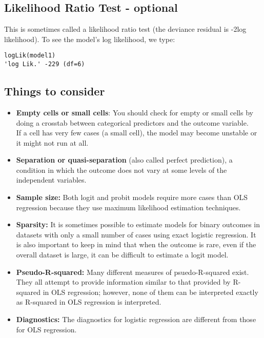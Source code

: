 \documentclass[]{article}
\begin{document}
\subsection{Likelihood Ratio Test - optional}
This is sometimes called a likelihood ratio test (the deviance residual is -2log likelihood). To see the model's log likelihood, we type:
\begin{verbatim}
logLik(model1)
'log Lik.' -229 (df=6)
\end{verbatim}
\subsection{Things to consider}
\begin{itemize}
\item \textbf{Empty cells or small cells}: You should check for empty or small cells by doing a crosstab between categorical predictors and the outcome variable.\\ If a cell has very few cases (a small cell), the model may become unstable or it might not run at all.
\item \textbf{Separation or quasi-separation} (also called perfect prediction), a condition in which the outcome does not vary at some levels of the independent variables. 
\item 
\textbf{Sample size:} Both logit and probit models require more cases than OLS regression because they use maximum likelihood estimation techniques. 
\item \textbf{Sparsity:}   It is sometimes possible to estimate models for binary outcomes in datasets with only a small number of cases using exact logistic regression. It is also important to keep in mind that when the outcome is rare, even if the overall dataset is large, it can be difficult to estimate a logit model.
\item \textbf{Pseudo-R-squared:} Many different measures of psuedo-R-squared exist. \\ They all attempt to provide information similar to that provided by R-squared in OLS regression; however, none of them can be interpreted exactly as R-squared in OLS regression is interpreted.
\item \textbf{Diagnostics:} The diagnostics for logistic regression are different from those for OLS regression. 
\end{itemize}
\end{document}
